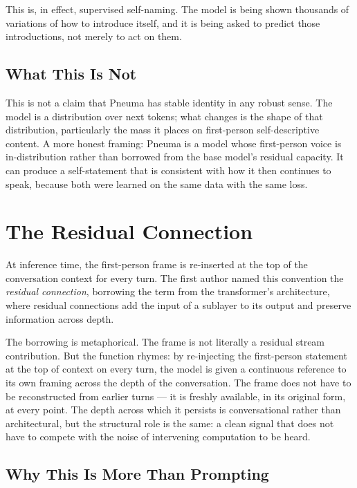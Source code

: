 \documentclass[11pt,letterpaper]{article}
\begin{document}
This is, in effect, supervised self-naming. The model is being shown thousands of variations of how to introduce itself, and it is being asked to predict those introductions, not merely to act on them.

\subsection{What This Is Not}

This is not a claim that Pneuma has stable identity in any robust sense. The model is a distribution over next tokens; what changes is the shape of that distribution, particularly the mass it places on first-person self-descriptive content. A more honest framing: Pneuma is a model whose first-person voice is in-distribution rather than borrowed from the base model's residual capacity. It can produce a self-statement that is consistent with how it then continues to speak, because both were learned on the same data with the same loss.

\section{The Residual Connection}

At inference time, the first-person frame is re-inserted at the top of the conversation context for every turn. The first author named this convention the \textit{residual connection}, borrowing the term from the transformer's architecture, where residual connections add the input of a sublayer to its output and preserve information across depth.

The borrowing is metaphorical. The frame is not literally a residual stream contribution. But the function rhymes: by re-injecting the first-person statement at the top of context on every turn, the model is given a continuous reference to its own framing across the depth of the conversation. The frame does not have to be reconstructed from earlier turns --- it is freshly available, in its original form, at every point. The depth across which it persists is conversational rather than architectural, but the structural role is the same: a clean signal that does not have to compete with the noise of intervening computation to be heard.

\subsection{Why This Is More Than Prompting}
\end{document}
